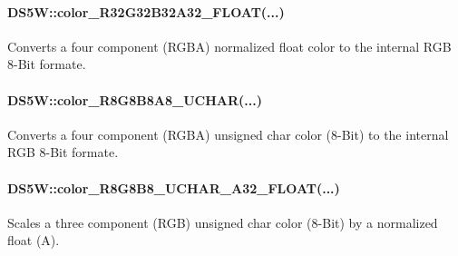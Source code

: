 \paragraph{DS5W::color\_R32G32B32A32\_FLOAT(...)}
Converts a four component (RGBA) normalized float color to the internal RGB 8-Bit formate.\\


\paragraph{DS5W::color\_R8G8B8A8\_UCHAR(...)}
Converts a four component (RGBA) unsigned char color (8-Bit) to the internal RGB 8-Bit formate.\\


\paragraph{DS5W::color\_R8G8B8\_UCHAR\_A32\_FLOAT(...)}
Scales a three component (RGB) unsigned char color (8-Bit) by a normalized float (A).\\



\newpage